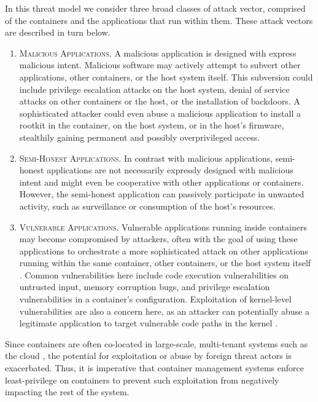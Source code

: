 In this threat model we consider three broad classes of attack vector, comprised of the containers and the applications that run within them. These attack vectors are described in turn below.
\begin{enumerate}[label=\bfseries AV\arabic*., ref=AV\arabic*, labelindent=1em]
  \item \textsc{Malicious Applications.}
    A malicious application is designed with express malicious intent. Malicious software may actively attempt to subvert other applications, other containers, or the host system itself. This subversion could include privilege escalation attacks on the host system, denial of service attacks on other containers or the host, or the installation of backdoors. A sophisticated attacker could even abuse a malicious application to install a rootkit \cite{beegle2007_rootkit} in the container, on the host system, or in the host's firmware, stealthily gaining permanent and possibly overprivileged access.
  \item \textsc{Semi-Honest Applications.}
    In contrast with malicious applications, semi-honest applications are not necessarily expressly designed with malicious intent and might even be cooperative with other applications or containers. However, the semi-honest application can passively participate in unwanted activity, such as surveillance or consumption of the host's resources.
  \item \textsc{Vulnerable Applications.}
    Vulnerable applications running inside containers may become compromised by attackers, often with the goal of using these applications to orchestrate a more sophisticated attack on other applications running within the same container, other containers, or the host system itself \cite{sultan2019_container_security}. Common vulnerabilities here include code execution vulnerabilities on untrusted input, memory corruption bugs, and privilege escalation vulnerabilities in a container's configuration. Exploitation of kernel-level vulnerabilities are also a concern here, as an attacker can potentially abuse a legitimate application to target vulnerable code paths in the kernel \cite{xin2018_container_security}.
\end{enumerate}

Since containers are often co-located in large-scale, multi-tenant systems such as the cloud \cite{sultan2019_container_security}, the potential for exploitation or abuse by foreign threat actors is exacerbated. Thus, it is imperative that container management systems enforce least-privilege on containers to prevent such exploitation from negatively impacting the rest of the system.

